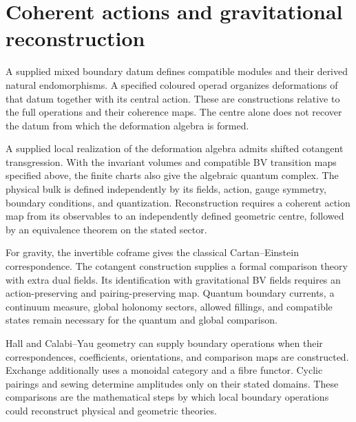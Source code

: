 \section{Coherent actions and gravitational reconstruction}
A supplied mixed boundary datum defines compatible modules and their derived natural endomorphisms. A specified coloured operad organizes deformations of that datum together with its central action. These are constructions relative to the full operations and their coherence maps. The centre alone does not recover the datum from which the deformation algebra is formed.

A supplied local realization of the deformation algebra admits shifted cotangent transgression. With the invariant volumes and compatible BV transition maps specified
above, the finite charts also give the algebraic quantum complex. The physical bulk is defined independently by its fields, action, gauge symmetry, boundary conditions, and quantization. Reconstruction requires a coherent action map from its observables to an independently defined geometric centre, followed by an equivalence theorem on the stated sector.

For gravity, the invertible coframe gives the classical Cartan--Einstein correspondence. The cotangent construction supplies a formal comparison theory with extra dual fields. Its identification with gravitational BV fields requires an action-preserving and pairing-preserving map. Quantum boundary currents, a continuum measure, global holonomy sectors, allowed fillings, and compatible states remain necessary for the quantum and global comparison.

Hall and Calabi--Yau geometry can supply boundary operations when their correspondences, coefficients, orientations, and comparison maps are constructed. Exchange additionally uses a monoidal category and a fibre functor. Cyclic pairings and sewing determine amplitudes only on their stated domains. These comparisons are the mathematical steps by which local boundary operations could reconstruct physical and geometric theories.
